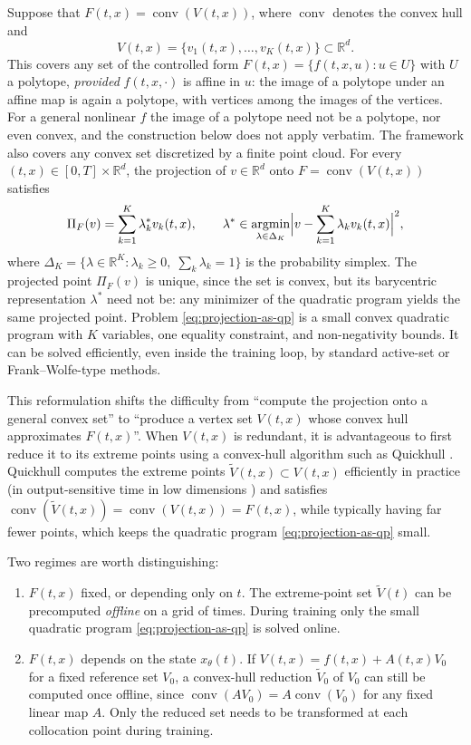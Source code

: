 \documentclass[11pt]{elsarticle}
\theoremstyle{definition}
\theoremstyle{remark}
\numberwithin{equation}{section}
\begin{document}
	Suppose that $F(t,x)=\operatorname{conv}(V(t,x))$, where $\operatorname{conv}$ denotes the convex hull and
	\[
	V(t,x)=\{v_1(t,x),\dots,v_K(t,x)\}\subset\mathbb{R}^d.
	\]
	This covers
	any set of the controlled form $F(t,x)=\{f(t,x,u):u\in U\}$ with $U$ a
	polytope, \emph{provided} $f(t,x,\cdot)$ is affine in $u$: the image of
	a polytope under an affine map is again a polytope, with vertices among
	the images of the vertices. For a general nonlinear $f$ the image of a
	polytope need not be a polytope, nor even convex, and the construction
	below does not apply verbatim. The framework also covers
	any convex set discretized by a finite point cloud.  
	For every $(t,x)\in[0,T]\times\mathbb{R}^d$, the projection of
	$v\in\mathbb{R}^d$ onto
	$F=\operatorname{conv}(V(t,x))$ satisfies
	\begin{equation}\label{eq:projection-as-qp}
		\Pi_F(v)
		=
		\sum_{k=1}^K\lambda_k^\ast v_k(t,x),
		\qquad
		\lambda^\ast
		\in
		\operatorname*{argmin}_{\lambda\in\Delta_K}
		\Bigl|v-\sum_{k=1}^K\lambda_k v_k(t,x)\Bigr|^2,
	\end{equation}
	where $\Delta_K=\{\lambda\in\mathbb{R}^K:\lambda_k\ge0,\;\sum_k\lambda_k=1\}$
	is the probability simplex.  The projected point $\Pi_F(v)$ is unique,
	since the set is convex, but its barycentric representation
	$\lambda^\ast$ need not be: any minimizer of the quadratic program
	yields the same projected point.  Problem \eqref{eq:projection-as-qp} is a
	small convex quadratic program with $K$ variables, one equality
	constraint, and non-negativity bounds.  It can be solved efficiently, even
	inside the training loop, by standard active-set or Frank--Wolfe-type
	methods.
	
	This reformulation shifts the difficulty from ``compute the projection
	onto a general convex set'' to ``produce a vertex set $V(t,x)$ whose
	convex hull approximates $F(t,x)$''.  When $V(t,x)$ is
	redundant, it is advantageous to first reduce it to its extreme points
	using a convex-hull algorithm such as Quickhull \cite{barber1996}.
	Quickhull computes the extreme points $\widetilde{V}(t,x)\subset V(t,x)$
	efficiently in practice (in output-sensitive time in low dimensions
	\cite{barber1996}) and satisfies
	$\operatorname{conv}(\widetilde{V}(t,x))=\operatorname{conv}(V(t,x))=F(t,x)$,
	while typically having far fewer points, which keeps the quadratic
	program \eqref{eq:projection-as-qp} small.
	
	Two regimes are worth distinguishing:
	\begin{enumerate}
		\item $F(t,x)$ fixed, or depending only on $t$.
		The extreme-point set $\widetilde{V}(t)$ can be precomputed
		\emph{offline} on a grid of times.  During training only the small
		quadratic program \eqref{eq:projection-as-qp} is solved online.
		\item $F(t,x)$ depends on the state $x_\theta(t)$.
		If $V(t,x)=f(t,x)+A(t,x)V_0$ for a fixed reference set $V_0$, a
		convex-hull reduction $\widetilde{V}_0$ of $V_0$ can still be
		computed once offline, since $\operatorname{conv}(AV_0)=A\operatorname{conv}(V_0)$
		for any fixed linear map $A$.  Only the reduced set needs to be
		transformed at each collocation point during training.
	\end{enumerate}
	
\end{document}
